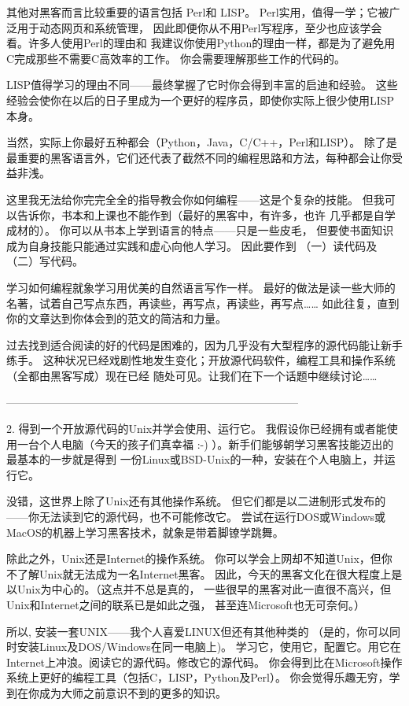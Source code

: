 \documentclass[a4paper,12pt,UTF8,twoside]{ctexbook}
\begin{document}
其他对黑客而言比较重要的语言包括 Perl和 LISP。 Perl实用，值得一学；它被广泛用于动态网页和系统管理， 因此即便你从不用Perl写程序，至少也应该学会看。许多人使用Perl的理由和 我建议你使用Python的理由一样，都是为了避免用C完成那些不需要C高效率的工作。 你会需要理解那些工作的代码的。

LISP值得学习的理由不同——最终掌握了它时你会得到丰富的启迪和经验。 这些经验会使你在以后的日子里成为一个更好的程序员，即使你实际上很少使用LISP本身。

当然，实际上你最好五种都会（Python，Java，C/C++，Perl和LISP）。 除了是最重要的黑客语言外，它们还代表了截然不同的编程思路和方法，每种都会让你受益非浅。

这里我无法给你完完全全的指导教会你如何编程——这是个复杂的技能。 但我可以告诉你，书本和上课也不能作到（最好的黑客中，有许多，也许 几乎都是自学成材的）。 你可以从书本上学到语言的特点——只是一些皮毛， 但要使书面知识成为自身技能只能通过实践和虚心向他人学习。 因此要作到 （一）读代码及（二）写代码。

学习如何编程就象学习用优美的自然语言写作一样。 最好的做法是读一些大师的名著，试着自己写点东西，再读些，再写点，再读些，再写点…… 如此往复，直到你的文章达到你体会到的范文的简洁和力量。

过去找到适合阅读的好的代码是困难的，因为几乎没有大型程序的源代码能让新手练手。 这种状况已经戏剧性地发生变化；开放源代码软件，编程工具和操作系统（全都由黑客写成）现在已经 随处可见。让我们在下一个话题中继续讨论……


--------------------------------------------------------------------------------

2. 得到一个开放源代码的Unix并学会使用、运行它。
我假设你已经拥有或者能使用一台个人电脑（今天的孩子们真幸福 :-) ）。新手们能够朝学习黑客技能迈出的最基本的一步就是得到 一份Linux或BSD-Unix的一种，安装在个人电脑上，并运行它。

没错，这世界上除了Unix还有其他操作系统。 但它们都是以二进制形式发布的——你无法读到它的源代码，也不可能修改它。 尝试在运行DOS或Windows或MacOS的机器上学习黑客技术，就象是带着脚镣学跳舞。

除此之外，Unix还是Internet的操作系统。 你可以学会上网却不知道Unix，但你不了解Unix就无法成为一名Internet黑客。 因此，今天的黑客文化在很大程度上是以Unix为中心的。（这点并不总是真的， 一些很早的黑客对此一直很不高兴，但Unix和Internet之间的联系已是如此之强， 甚至连Microsoft也无可奈何。）

所以, 安装一套UNIX——我个人喜爱LINUX但还有其他种类的 （是的，你可以同时安装Linux及DOS/Windows在同一电脑上)。 学习它，使用它，配置它。用它在Internet上冲浪。阅读它的源代码。修改它的源代码。 你会得到比在Microsoft操作系统上更好的编程工具（包括C，LISP，Python及Perl）。 你会觉得乐趣无穷，学到在你成为大师之前意识不到的更多的知识。
\end{document}
